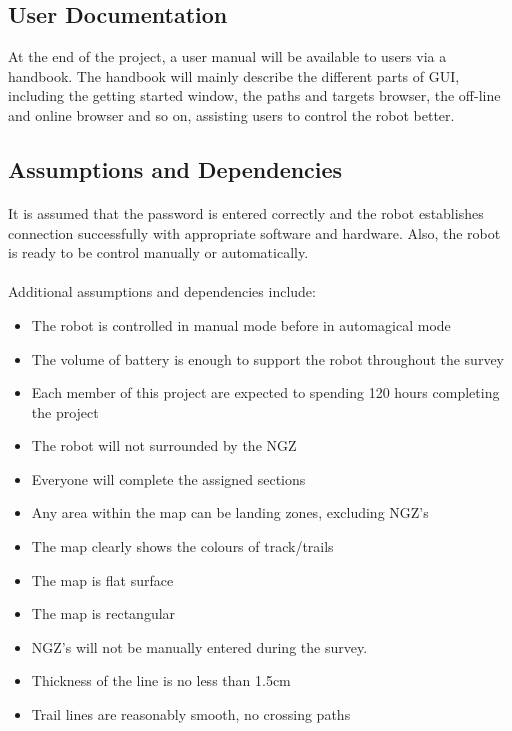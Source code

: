 \documentclass[10pt,a4paper,titlepage]{article}
\begin{document}
	\subsection{User Documentation}
	At the end of the project, a user manual will be available to users via a handbook. The handbook will mainly describe the different parts of GUI, including the getting started window, the paths and targets browser, the off-line and online browser and so on, assisting users to control the robot better.
	
	\subsection{Assumptions and Dependencies}
	\paragraph{}
	It is assumed that the password is entered correctly and the robot establishes connection successfully with appropriate software and hardware. Also, the robot is ready to be control manually or automatically.  
	\paragraph{}
	Additional assumptions and dependencies include: 
	\begin{itemize}
		\item The robot is controlled in manual mode before in automagical mode
		\item The volume of battery is enough to support the robot throughout the survey
		\item Each member of this project are expected to spending 120 hours completing the project
		\item The robot will not surrounded by the NGZ
		\item Everyone will complete the assigned sections 
		\item Any area within the map can be landing zones, excluding NGZ's
		\item The map clearly shows the colours of track/trails
		\item The map is flat surface
		\item The map is rectangular
		\item NGZ's will not be manually entered during the survey.
		\item Thickness of the line is no less than 1.5cm
		\item Trail lines are reasonably smooth, no crossing paths
	\end{itemize}
	
\end{document}
